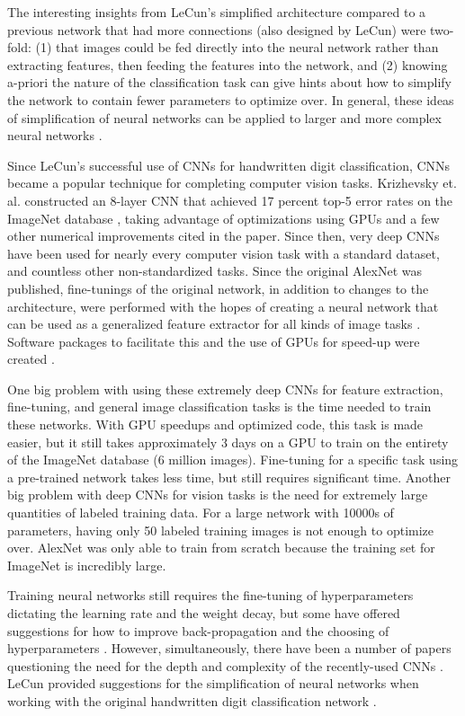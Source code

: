 \documentclass[10pt]{article}
\begin{document}
The interesting insights from LeCun's simplified architecture \cite{lecun_handwritten_1990} compared to a previous network that had more connections (also designed by LeCun) \cite{lecun_backpropagation_1989} were two-fold: (1) that images could be fed directly into the neural network rather than extracting features, then feeding the features into the network, and (2) knowing a-priori the nature of the classification task can give hints about how to simplify the network to contain fewer parameters to optimize over. In general, these ideas of simplification of neural networks can be applied to larger and more complex neural networks \cite{lecun_optimal_1989}. 

Since LeCun's successful use of CNNs for handwritten digit classification, CNNs became a popular technique for completing computer vision tasks. Krizhevsky et. al. \cite{krizhevsky_imagenet_2012} constructed an 8-layer CNN that achieved 17 percent top-5 error rates on the ImageNet database \cite{russakovsky_imagenet_2014}, taking advantage of optimizations using GPUs and a few other numerical improvements cited in the paper. Since then, very deep CNNs have been used for nearly every computer vision task with a standard dataset, and countless other non-standardized tasks. Since the original AlexNet was published, fine-tunings of the original network, in addition to changes to the architecture, were performed with the hopes of creating a neural network that can be used as a generalized feature extractor for all kinds of image tasks \cite{donahue_decaf:_2014}. Software packages to facilitate this and the use of GPUs for speed-up were created \cite{jia_caffe:_2014}. 

One big problem with using these extremely deep CNNs for feature extraction, fine-tuning, and general image classification tasks is the time needed to train these networks. With GPU speedups and optimized code, this task is made easier, but it still takes approximately 3 days on a GPU to train on the entirety of the ImageNet database (6 million images). Fine-tuning for a specific task using a pre-trained network takes less time, but still requires significant time. Another big problem with deep CNNs for vision tasks is the need for extremely large quantities of labeled training data. For a large network with 10000s of parameters, having only 50 labeled training images is not enough to optimize over. AlexNet was only able to train from scratch because the training set for ImageNet is incredibly large. 

Training neural networks still requires the fine-tuning of hyperparameters dictating the learning rate and the weight decay, but some have offered suggestions for how to improve back-propagation and the choosing of hyperparameters \cite{bottou_large-scale_2010}. However, simultaneously, there have been a number of papers questioning the need for the depth and complexity of the recently-used CNNs \cite{ba_deep_2013}. LeCun provided suggestions for the simplification of neural networks when working with the original handwritten digit classification network \cite{lecun_optimal_1989}.
\end{document}
